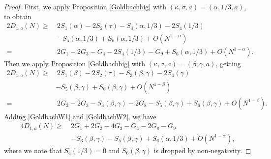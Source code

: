 \documentclass[12pt, a4paper]{amsart}
\def\ge{\geqslant}
\theoremstyle{plain}
\theoremstyle{remark}
\numberwithin{equation}{section}
\begin{document}
\begin{proof}
First, we apply Proposition \ref{Goldbachbig} with $(\kappa,\sigma,a)=(\alpha,1/3,a)$, to obtain
\begin{equation}\label{GoldbachW1}
\begin{split}
2D_{1,a}(N)
\ge\ & 2S_1(\alpha)-2S_2(\tau)-S_3(\alpha,1/3)-2S_4(1/3)\\
&-S_5(\alpha,1/3)+S_6(\alpha,1/3)+O(N^{1-\alpha})\\
=\ & 2G_1-2G_3-G_4-2S_4(1/3)-G_9+S_6(\alpha,1/3)+O(N^{1-\alpha}).  
\end{split}
\end{equation}
Then we apply Proposition \ref{Goldbachbig} with $(\kappa,\sigma,a)=(\beta,\gamma,a)$, getting 
\begin{equation}\label{GoldbachW2}
\begin{split}
2D_{1,a}(N)
\ge&\  2S_1(\beta)-2S_2(\tau)-S_3(\beta,\gamma)-2S_4(\gamma)\\
&-S_5(\beta,\gamma)+S_6(\beta,\gamma)+O(N^{1-\beta})\\
=&\ 2G_2-2G_3-S_3(\beta,\gamma)-2G_8-S_5(\beta,\gamma)+S_6(\beta,\gamma)+O(N^{1-\beta}). 
\end{split}
\end{equation} 
Adding \eqref{GoldbachW1} and \eqref{GoldbachW2}, 
we have
\begin{equation}\label{GoldbachW3}
\begin{split}
4D_{1,a}(N)
\ge\ & 2G_1+2G_2-4G_3-G_4-2G_8-G_9\\
&-S_3(\beta,\gamma)-S_5(\beta,\gamma)+S_6(\alpha,1/3)+O(N^{1-\alpha}), 
\end{split}
\end{equation}
where we note that $S_4(1/3)=0$ and $S_6(\beta,\gamma)$ is dropped by non-negativity. 


\end{proof}
\end{document}
